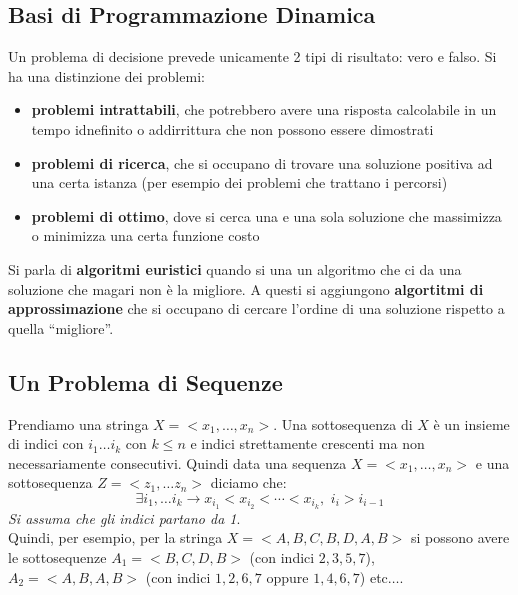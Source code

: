 \documentclass[a4paper,12pt, oneside]{book}
\begin{document}
\subsection{Basi di Programmazione Dinamica}
Un problema di decisione prevede unicamente 2 tipi di risultato: vero
e falso. Si ha una distinzione dei problemi:
\begin{itemize}
  \item \textbf{problemi intrattabili}, che potrebbero avere una
  risposta calcolabile in un tempo idnefinito o addirrittura che non
  possono essere dimostrati
  \item \textbf{problemi di ricerca}, che si occupano di trovare una
  soluzione positiva ad una certa istanza (per esempio dei problemi
  che trattano i percorsi)
  \item \textbf{problemi di ottimo}, dove si cerca una e una sola
  soluzione che massimizza o minimizza una certa funzione costo
\end{itemize}
Si parla di \textbf{algoritmi euristici} quando si una un algoritmo
che ci da una soluzione che magari non è la migliore. A questi si
aggiungono \textbf{algortitmi di approssimazione} che si occupano di
cercare l'ordine di una soluzione rispetto a quella ``migliore''.
\subsection{Un Problema di Sequenze}
Prendiamo una stringa $X=<x_1,\ldots,x_n>$. Una sottosequenza di $X$ è
un insieme di indici con $i_1\ldots i_k$ con $k\leq n$ e indici
strettamente crescenti ma non necessariamente consecutivi. Quindi data
una sequenza $X=<x_1,\ldots,x_n>$ e una sottosequenza $Z=<z_1,\ldots
z_n>$ diciamo che:
\[\exists i_1,\ldots i_k \to x_{i_1}< x_{i_2} < \cdots < x_{i_k},\,\,
  i_i > i_{i-1}\]
\textit{Si assuma che gli indici partano da 1}.\\
Quindi, per esempio, per la stringa $X=<A,B,C,B,D,A,B>$ si possono
avere le sottosequenze $A_1 = <B,C,D,B>$ (con indici $2,3,5,7$),
$A_2=<A,B,A,B>$ (con indici $1,2,6,7$ oppure $1,4,6,7$) etc$\ldots$.
\end{document}
